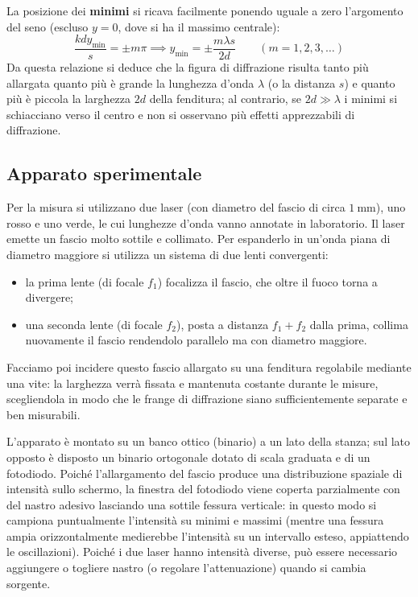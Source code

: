 \documentclass[openany,a4paper,12pt]{book}
\begin{document}
La posizione dei \textbf{minimi} si ricava facilmente ponendo uguale a zero l'argomento del seno (escluso $y=0$, dove si ha il massimo centrale):
\[
    \frac{k d y_{\min}}{s} = \pm m\pi \implies y_{\min} = \pm \frac{m \lambda s}{2d} \qquad (m = 1, 2, 3, \dots)
\]
Da questa relazione si deduce che la figura di diffrazione risulta tanto più allargata quanto più è grande la lunghezza d'onda $\lambda$ (o la distanza $s$) e quanto più è piccola la larghezza $2d$ della fenditura; al contrario, se $2d \gg \lambda$ i minimi si schiacciano verso il centro e non si osservano più effetti apprezzabili di diffrazione.

\subsection*{Apparato sperimentale}

Per la misura si utilizzano due laser (con diametro del fascio di circa $\SI{1}{\milli\meter}$), uno rosso e uno verde, le cui lunghezze d'onda vanno annotate in laboratorio.
Il laser emette un fascio molto sottile e collimato. Per espanderlo in un'onda piana di diametro maggiore si utilizza un sistema di due lenti convergenti:
\begin{itemize}
    \item la prima lente (di focale $f_1$) focalizza il fascio, che oltre il fuoco torna a divergere;
    \item una seconda lente (di focale $f_2$), posta a distanza $f_1 + f_2$ dalla prima, collima nuovamente il fascio rendendolo parallelo ma con diametro maggiore.
\end{itemize}

Facciamo poi incidere questo fascio allargato su una fenditura regolabile mediante una vite: la larghezza verrà fissata e mantenuta costante durante le misure, scegliendola in modo che le frange di diffrazione siano sufficientemente separate e ben misurabili.

L'apparato è montato su un banco ottico (binario) a un lato della stanza; sul lato opposto è disposto un binario ortogonale dotato di scala graduata e di un fotodiodo. Poiché l'allargamento del fascio produce una distribuzione spaziale di intensità sullo schermo, la finestra del fotodiodo viene coperta parzialmente con del nastro adesivo lasciando una sottile fessura verticale: in questo modo si campiona puntualmente l'intensità su minimi e massimi (mentre una fessura ampia orizzontalmente medierebbe l'intensità su un intervallo esteso, appiattendo le oscillazioni). Poiché i due laser hanno intensità diverse, può essere necessario aggiungere o togliere nastro (o regolare l'attenuazione) quando si cambia sorgente.
\end{document}
